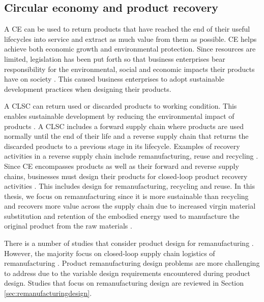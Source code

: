 \subsection{Circular economy and product recovery} \label{subsec:CE}

A \ac{CE} can be used to return products that have reached the end of their useful lifecycles into service and extract as much value from them as possible. \ac{CE} helps achieve both economic growth and environmental protection. Since resources are limited, legislation has been put forth so that business enterprises bear responsibility for the environmental, social and economic impacts their products have on society \cite{Matos2007}. This caused business enterprises to adopt sustainable development practices when designing their products.

A \ac{CLSC} can return used or discarded products to working condition. This enables sustainable development by reducing the environmental impact of products \cite{QuariguasiFrotaNeto2010}. A \ac{CLSC} includes a forward supply chain where products are used normally until the end of their life and a reverse supply chain that returns the discarded products to a previous stage in its lifecycle. Examples of recovery activities in a reverse supply chain include remanufacturing, reuse and recycling \cite{Lieder2016,MacArthur2013a}. Since \ac{CE} encompasses products as well as their forward and reverse supply chains, businesses must design their products for closed-loop product recovery activities \cite{Lieder2016}. This includes design for remanufacturing, recycling and reuse. In this thesis, we focus on remanufacturing since it is more sustainable than recycling and recovers more value across the supply chain due to increased virgin material substitution and retention of the embodied energy used to manufacture the original product from the raw materials \cite{MacArthur2013a,Goodall2014}. 

There is a number of studies that consider product design for remanufacturing \cite{Ijomah2010,Liu2017}. However, the majority focus on closed-loop supply chain logistics of remanufacturing \cite{Mahadevan,Golinska2015,VanThao2015,Song2005,Koren2018}. Product remanufacturing design problems are more challenging to address due to the variable design requirements encountered during product design. Studies that focus on remanufacturing design are reviewed in Section \ref{sec:remanufacturingdesign}. 

